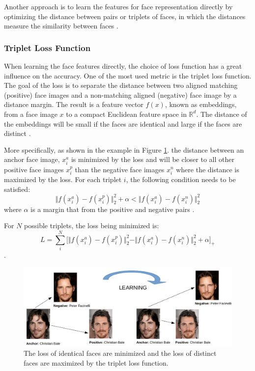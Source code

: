 \documentclass[12pt,english]{article}
\begin{document}
Another approach is to learn the features for face representation directly by optimizing the distance between pairs or triplets of faces, in which the distances measure the similarity between faces \cite{trigueros} \cite{schroff}. 

\subsubsection{Triplet Loss Function}

\quad
When learning the face features directly, the choice of loss function has a great influence on the accuracy. One of the most used metric is the triplet loss function. The goal of the loss is to separate the distance between two aligned matching (positive) face images and a non-matching aligned (negative) face image by a distance margin. The result is a feature vector $f(x)$, known as embeddings, from a face image $x$ to a compact Euclidean feature space in $ \mathbb{R}^{d}$. The distance of the embeddings will be small if the faces are identical and large if the faces are distinct \cite{schroff}.


More specifically, as shown in the example in Figure \ref{fig:bale}. the distance between an anchor face image, $x_{i}^{a}$ is minimized by the loss and will be closer to all other positive face images $x_{i}^{p}$ than the negative face images $x_{i}^{n}$ where the distance is maximized by the loss. For each triplet $i$, the following condition needs to be satisfied: $$\Vert f(x_{i}^{a}) - f(x_{i}^{p}) \Vert_{2}^{2} + \alpha < \Vert f(x_{i}^{a}) - f(x_{i}^{n}) \Vert_{2}^{2} $$
where $\alpha$ is a margin that from the positive and negative pairs \cite{trigueros}.

For $N$ possible triplets, the loss being minimized is: $$ L = \sum_{i}^{N} \Big[ \Vert f(x_{i}^{a}) - f(x_{i}^{p}) \Vert_{2}^{2} - \Vert f(x_{i}^{a}) - f(x_{i}^{n}) \Vert_{2}^{2} + \alpha\Big]_{+} $$ \cite{schroff}.

\begin{figure}[!tbp]
 \centering
    \includegraphics[width=\textwidth]{figures/triplet_loss_example.png}
    \caption{The loss of identical faces are minimized and the loss of distinct faces are maximized by the triplet loss function.}
	\label{fig:bale}
\end{figure}
 
\end{document}
